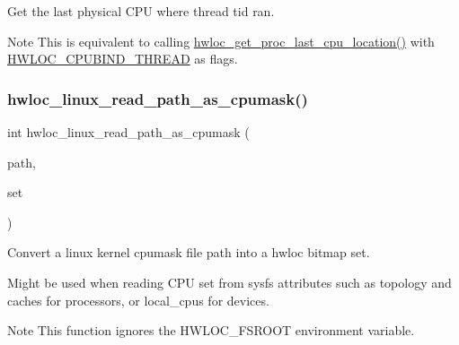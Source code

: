 Get the last physical C\+PU where thread {\ttfamily tid} ran. 

\begin{DoxyNote}{Note}
This is equivalent to calling \hyperlink{a00190_ga910a05c2d47f68a3155bf176b50fa555}{hwloc\+\_\+get\+\_\+proc\+\_\+last\+\_\+cpu\+\_\+location()} with \hyperlink{a00190_gga217dc8d373f8958cc93c154ebce1c71caf1b6bbad00d7b1017b918e3719f4d421}{H\+W\+L\+O\+C\+\_\+\+C\+P\+U\+B\+I\+N\+D\+\_\+\+T\+H\+R\+E\+AD} as flags. 
\end{DoxyNote}
\mbox{\label{a00214_gaf72d83e273803226ce772973e37b85de}} 
\subsubsection{\texorpdfstring{hwloc\+\_\+linux\+\_\+read\+\_\+path\+\_\+as\+\_\+cpumask()}{hwloc\_linux\_read\_path\_as\_cpumask()}}
{\footnotesize\ttfamily int hwloc\+\_\+linux\+\_\+read\+\_\+path\+\_\+as\+\_\+cpumask (\begin{DoxyParamCaption}\item[{const char $\ast$}]{path,  }\item[{\hyperlink{a00205_gaa3c2bf4c776d603dcebbb61b0c923d84}{hwloc\+\_\+bitmap\+\_\+t}}]{set }\end{DoxyParamCaption})}



Convert a linux kernel cpumask file {\ttfamily path} into a hwloc bitmap {\ttfamily set}. 

Might be used when reading C\+PU set from sysfs attributes such as topology and caches for processors, or local\+\_\+cpus for devices.

\begin{DoxyNote}{Note}
This function ignores the H\+W\+L\+O\+C\+\_\+\+F\+S\+R\+O\+OT environment variable. 
\end{DoxyNote}
\mbox{\label{a00214_ga630e699c56b5f3d2e534b475944c216e}} 
